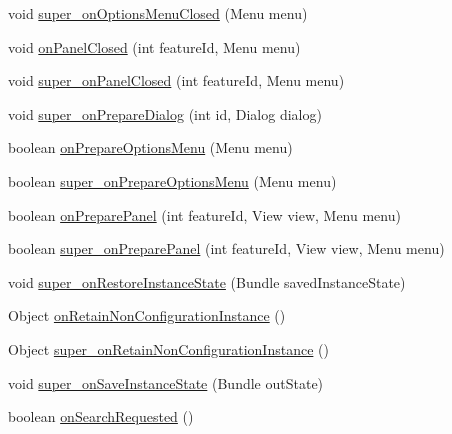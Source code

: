 \begin{DoxyCompactItemize}
\item 
void \hyperlink{classorg_1_1kde_1_1necessitas_1_1origo_1_1_qt_activity_a7b1ddef3a886d020e131a7710897d4b3}{super\-\_\-on\-Options\-Menu\-Closed} (Menu menu)
\item 
void \hyperlink{classorg_1_1kde_1_1necessitas_1_1origo_1_1_qt_activity_a46abda947b20a891ffd62d1fda0d9312}{on\-Panel\-Closed} (int feature\-Id, Menu menu)
\item 
void \hyperlink{classorg_1_1kde_1_1necessitas_1_1origo_1_1_qt_activity_a43b971f832fe35cee98100fd3020ac74}{super\-\_\-on\-Panel\-Closed} (int feature\-Id, Menu menu)
\item 
void \hyperlink{classorg_1_1kde_1_1necessitas_1_1origo_1_1_qt_activity_abe64410ee4d7fdce48de8fe4eec292ca}{super\-\_\-on\-Prepare\-Dialog} (int id, Dialog dialog)
\item 
boolean \hyperlink{classorg_1_1kde_1_1necessitas_1_1origo_1_1_qt_activity_af8fdf85b125a1511f8fa9de17ef2fb3e}{on\-Prepare\-Options\-Menu} (Menu menu)
\item 
boolean \hyperlink{classorg_1_1kde_1_1necessitas_1_1origo_1_1_qt_activity_a2bc1f780c3200c091102bbed2f65e169}{super\-\_\-on\-Prepare\-Options\-Menu} (Menu menu)
\item 
boolean \hyperlink{classorg_1_1kde_1_1necessitas_1_1origo_1_1_qt_activity_aaf7440c07d7d80c9a2667f1a2604a487}{on\-Prepare\-Panel} (int feature\-Id, View view, Menu menu)
\item 
boolean \hyperlink{classorg_1_1kde_1_1necessitas_1_1origo_1_1_qt_activity_a5e3bc74ca0884e910574b37082be74a0}{super\-\_\-on\-Prepare\-Panel} (int feature\-Id, View view, Menu menu)
\item 
void \hyperlink{classorg_1_1kde_1_1necessitas_1_1origo_1_1_qt_activity_a0b709730ad56cf746a324e4092e36650}{super\-\_\-on\-Restore\-Instance\-State} (Bundle saved\-Instance\-State)
\item 
Object \hyperlink{classorg_1_1kde_1_1necessitas_1_1origo_1_1_qt_activity_ade8faaf5e6f822d385c41326b52aa3cc}{on\-Retain\-Non\-Configuration\-Instance} ()
\item 
Object \hyperlink{classorg_1_1kde_1_1necessitas_1_1origo_1_1_qt_activity_a4012dea1acd57ed154d791e9afbe7115}{super\-\_\-on\-Retain\-Non\-Configuration\-Instance} ()
\item 
void \hyperlink{classorg_1_1kde_1_1necessitas_1_1origo_1_1_qt_activity_a596c0a00b5845bb8aa56593c17f65ab2}{super\-\_\-on\-Save\-Instance\-State} (Bundle out\-State)
\item 
boolean \hyperlink{classorg_1_1kde_1_1necessitas_1_1origo_1_1_qt_activity_a0a67a358a2048b86743f7e522dc629d6}{on\-Search\-Requested} ()

\end{DoxyCompactItemize}
